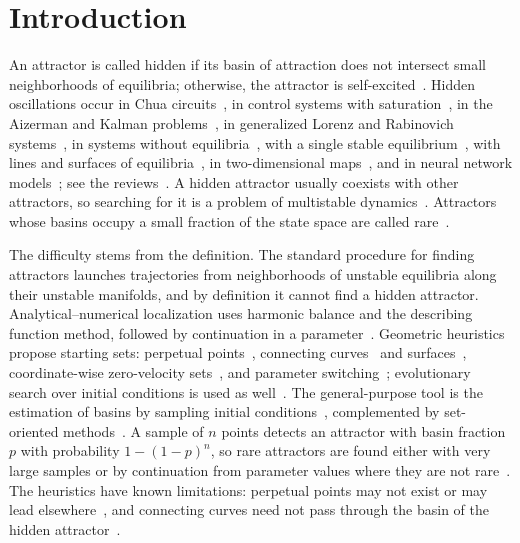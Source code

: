 \section{Introduction}\label{sec:intro}

An attractor is called hidden if its basin of attraction does not intersect small neighborhoods of equilibria; otherwise, the attractor is self-excited~\cite{LeonovKuznetsov2013,Leonov2011PLA,Kuznetsov2020JCSSI}. Hidden oscillations occur in Chua circuits~\cite{Leonov2012PhysD,Stankevich2017,Kuznetsov2023Chua}, in control systems with saturation~\cite{Andrievsky2017Aircraft}, in the Aizerman and Kalman problems~\cite{Bragin2011}, in generalized Lorenz and Rabinovich systems~\cite{Chen2017OnePath,Kuznetsov2018Rabinovich,Kuznetsov2020Lorenz}, in systems without equilibria~\cite{JafariSprottGolpayegani2013,Wei2011}, with a single stable equilibrium~\cite{WangChen2012,Molaie2013}, with lines and surfaces of equilibria~\cite{JafariSprott2013,Jafari2016Surfaces}, in two-dimensional maps~\cite{Jiang2016Maps,WangDing2018Map,Huynh2019}, and in neural network models~\cite{DancaKuznetsov2017Hopfield}; see the reviews~\cite{Dudkowski2016,JafariSprottNazarimehr2015,GuanXie2025}. A hidden attractor usually coexists with other attractors, so searching for it is a problem of multistable dynamics~\cite{Feudel2008,PisarchikFeudel2014}. Attractors whose basins occupy a small fraction of the state space are called rare~\cite{Chudzik2011Rare,Yue2021RareDuffing}.

The difficulty stems from the definition. The standard procedure for finding attractors launches trajectories from neighborhoods of unstable equilibria along their unstable manifolds, and by definition it cannot find a hidden attractor. Analytical--numerical localization uses harmonic balance and the describing function method, followed by continuation in a parameter~\cite{Leonov2011PLA,KuznetsovLeonovVagaitsev2010,Kuznetsov2017IFAC}. Geometric heuristics propose starting sets: perpetual points~\cite{Prasad2015,Dudkowski2015PP,Dudkowski2017PP}, connecting curves~\cite{Gilmore2010CC,GuanXie2021CC,Naseri2021} and surfaces~\cite{Song2023CS}, coordinate-wise zero-velocity sets~\cite{Godara2018CVS}, and parameter switching~\cite{Danca2018Switching}; evolutionary search over initial conditions is used as well~\cite{Zelinka2016,Zelinka2021Chapter}. The general-purpose tool is the estimation of basins by sampling initial conditions~\cite{Menck2013,DatserisWagemakers2022,Datseris2023Framework,StenderHoffmann2022,Gelbrecht2020MCBB}, complemented by set-oriented methods~\cite{Hsu1987,DellnitzHohmann1997}. A sample of $n$ points detects an attractor with basin fraction $p$ with probability $1-(1-p)^n$, so rare attractors are found either with very large samples or by continuation from parameter values where they are not rare~\cite{Brzeski2017,Datseris2023Framework,Datseris2026Global,Haerter2026BBT}. The heuristics have known limitations: perpetual points may not exist or may lead elsewhere~\cite{Nazarimehr2017PP,Jafari2015LimitPP,Jafari2026NoPP}, and connecting curves need not pass through the basin of the hidden attractor~\cite{GuanXie2025}.

